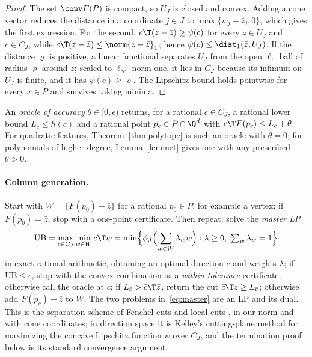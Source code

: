 \begin{proof}
The set $\conv F(P)$ is compact, so $U_J$ is closed and convex. Adding a cone
vector reduces the distance in a coordinate $j\in J$ to $\max\{w_j-\bar z_j,0\}$,
which gives the first expression. For the second, $c\T(z-\bar z)\ge\psi(c)$ for
every $z\in U_J$ and $c\in C_J$, while $c\T(z-\bar z)\le\norm{z-\bar z}_1$; hence
$\psi(c)\le\dist_1(\bar z,U_J)$. If the distance $\varrho$ is positive, a linear
functional separates $U_J$ from the open $\ell_1$ ball of radius $\varrho$ around
$\bar z$; scaled to $\ell_\infty$ norm one, it lies in $C_J$ because its infimum
on $U_J$ is finite, and it has $\psi(c)\ge\varrho$. The Lipschitz bound holds
pointwise for every $x\in P$ and survives taking minima.
\end{proof}

An \emph{oracle of accuracy} $\theta\in[0,\epsilon)$ returns, for a rational
$c\in C_J$, a rational lower bound $L_c\le h(c)$ and a rational point $p_c\in P\cap\Q^d$ with
$c\T F(p_c)\le L_c+\theta$. For quadratic features, Theorem~\ref{thm:polytope} is
such an oracle with $\theta=0$; for polynomials of higher degree,
Lemma~\ref{lem:net} gives one with any prescribed $\theta>0$.

\paragraph{Column generation.}
Start with $W=\{F(p_0)-\bar z\}$ for a rational $p_0\in P$, for example a vertex;
if $F(p_0)=\bar z$, stop with a one-point certificate. Then repeat: solve the
\emph{master LP}
\begin{equation}\label{eq:master}
\mathrm{UB}=\max_{c\in C_J}\min_{w\in W}c\T w
=\min\Bigl\{\phi_J\Bigl(\sum_{w\in W}\lambda_ww\Bigr):\lambda\ge0,\ \textstyle\sum_w\lambda_w=1\Bigr\}
\end{equation}
in exact rational arithmetic, obtaining an optimal direction $\bar c$ and
weights $\lambda$; if $\mathrm{UB}\le\epsilon$, stop with the convex combination as
a \emph{within-tolerance} certificate; otherwise call the oracle at $\bar c$; if
$L_{\bar c}>\bar c\T\bar z$, return the cut $\bar c\T z\ge L_{\bar c}$; otherwise add
$F(p_{\bar c})-\bar z$ to $W$. The two problems in~\eqref{eq:master} are an LP
and its dual. This is the separation scheme of Fenchel cuts and local cuts
\citep{Boyd1994,ChvatalCookEspinoza2013}, in our norm and with cone
coordinates; in direction space it is Kelley's cutting-plane method
\citep{CheneyGoldstein1959,Kelley1960} for maximizing the concave Lipschitz
function $\psi$ over $C_J$, and the termination proof below is its standard
convergence argument.

